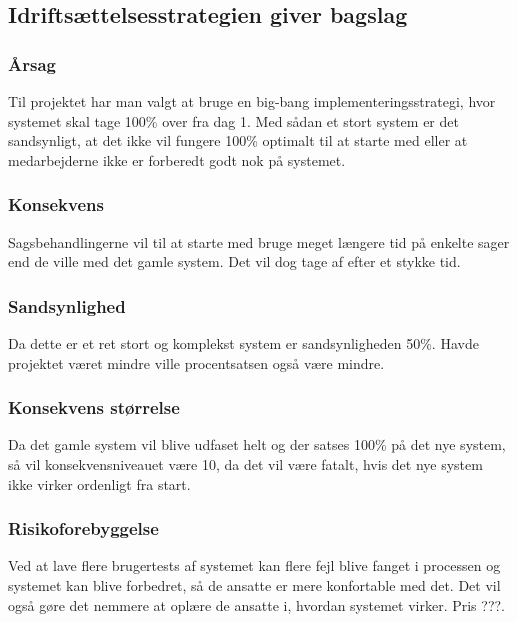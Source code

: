 \documentclass[10pt,a4paper,danish]{article}
\begin{document}






\subsection{Idriftsættelsesstrategien giver bagslag}
\subsubsection{Årsag}
Til projektet har man valgt at bruge en big-bang implementeringsstrategi, hvor systemet skal tage 100\% over fra dag 1.
Med sådan et stort system er det sandsynligt, at det ikke vil fungere 100\% optimalt til at starte med eller at medarbejderne ikke er forberedt godt nok på systemet.
\subsubsection{Konsekvens}
Sagsbehandlingerne vil til at starte med bruge meget længere tid på enkelte sager end de ville med det gamle system. Det vil dog tage af efter et stykke tid.
\subsubsection{Sandsynlighed}
Da dette er et ret stort og komplekst system er sandsynligheden 50\%. Havde projektet været mindre ville procentsatsen også være mindre.
\subsubsection{Konsekvens størrelse}
Da det gamle system vil blive udfaset helt og der satses 100\% på det nye system, så vil konsekvensniveauet være 10, da det vil være fatalt, hvis det nye system ikke virker ordenligt fra start.
\subsubsection{Risikoforebyggelse}
Ved at lave flere brugertests af systemet kan flere fejl blive fanget i processen og systemet kan blive forbedret, så de ansatte er mere konfortable med det. Det vil også gøre det nemmere at oplære de ansatte i, hvordan systemet virker. Pris ???.
\end{document}

